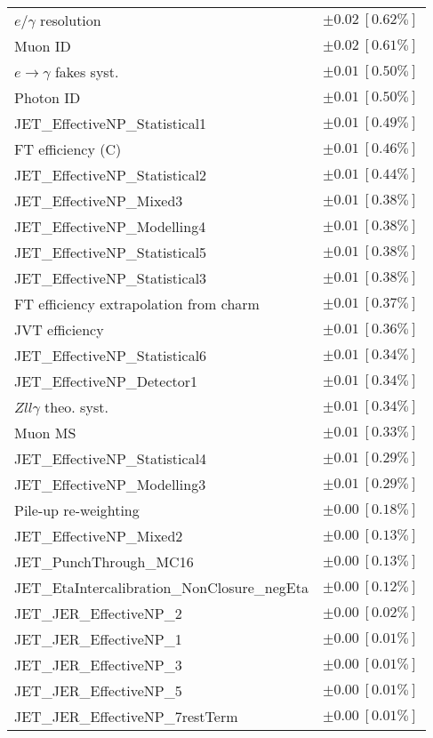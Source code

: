 \begin{tabular}{lr}
$e/\gamma$ resolution & $\pm 0.02\ [0.62\%]$ \\
Muon ID & $\pm 0.02\ [0.61\%]$ \\
$e\to\gamma$ fakes syst. & $\pm 0.01\ [0.50\%]$ \\
Photon ID & $\pm 0.01\ [0.50\%]$ \\
JET\_EffectiveNP\_Statistical1 & $\pm 0.01\ [0.49\%]$ \\
FT efficiency (C) & $\pm 0.01\ [0.46\%]$ \\
JET\_EffectiveNP\_Statistical2 & $\pm 0.01\ [0.44\%]$ \\
JET\_EffectiveNP\_Mixed3 & $\pm 0.01\ [0.38\%]$ \\
JET\_EffectiveNP\_Modelling4 & $\pm 0.01\ [0.38\%]$ \\
JET\_EffectiveNP\_Statistical5 & $\pm 0.01\ [0.38\%]$ \\
JET\_EffectiveNP\_Statistical3 & $\pm 0.01\ [0.38\%]$ \\
FT efficiency extrapolation from charm & $\pm 0.01\ [0.37\%]$ \\
JVT efficiency & $\pm 0.01\ [0.36\%]$ \\
JET\_EffectiveNP\_Statistical6 & $\pm 0.01\ [0.34\%]$ \\
JET\_EffectiveNP\_Detector1 & $\pm 0.01\ [0.34\%]$ \\
$Zll\gamma$ theo. syst. & $\pm 0.01\ [0.34\%]$ \\
Muon MS & $\pm 0.01\ [0.33\%]$ \\
JET\_EffectiveNP\_Statistical4 & $\pm 0.01\ [0.29\%]$ \\
JET\_EffectiveNP\_Modelling3 & $\pm 0.01\ [0.29\%]$ \\
Pile-up re-weighting & $\pm 0.00\ [0.18\%]$ \\
JET\_EffectiveNP\_Mixed2 & $\pm 0.00\ [0.13\%]$ \\
JET\_PunchThrough\_MC16 & $\pm 0.00\ [0.13\%]$ \\
JET\_EtaIntercalibration\_NonClosure\_negEta & $\pm 0.00\ [0.12\%]$ \\
JET\_JER\_EffectiveNP\_2 & $\pm 0.00\ [0.02\%]$ \\
JET\_JER\_EffectiveNP\_1 & $\pm 0.00\ [0.01\%]$ \\
JET\_JER\_EffectiveNP\_3 & $\pm 0.00\ [0.01\%]$ \\
JET\_JER\_EffectiveNP\_5 & $\pm 0.00\ [0.01\%]$ \\
JET\_JER\_EffectiveNP\_7restTerm & $\pm 0.00\ [0.01\%]$ \\
\hline
\end{tabular}
